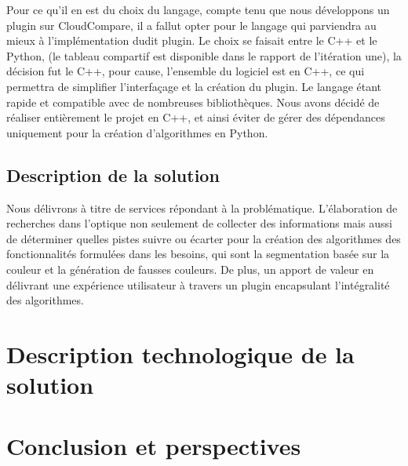\documentclass[12pt,titlepage,french]{article}
\begin{document}
Pour ce qu'il en est du choix du langage, compte tenu que nous développons un plugin sur CloudCompare, il a fallut opter pour le langage qui parviendra au mieux à l'implémentation dudit plugin. Le choix se faisait entre le C++ et le Python, (le tableau compartif est disponible dans le rapport de l'itération une), la décision fut le C++, pour cause, l'ensemble du logiciel est en C++, ce qui permettra de simplifier l'interfaçage et la création du plugin. 
Le langage étant rapide et compatible avec de nombreuses bibliothèques. Nous avons décidé de réaliser entièrement le projet en C++, et ainsi éviter de gérer des dépendances uniquement pour la création d'algorithmes en Python.
\newpage
\subsection{Description de la solution}

Nous délivrons à titre de services répondant à la problématique. L'élaboration de recherches dans l'optique non seulement de collecter des informations mais aussi de déterminer quelles pistes suivre ou écarter pour la création des algorithmes des fonctionnalités formulées dans les besoins, qui sont la segmentation basée sur la couleur et la génération de fausses couleurs.
De plus, un apport de valeur en délivrant une expérience utilisateur à travers un plugin encapsulant l'intégralité des algorithmes.

\section{Description technologique de la solution}

\section{Conclusion et perspectives}
\end{document}
